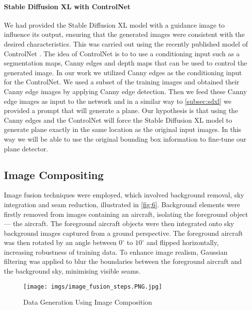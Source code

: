 \paragraph{Stable Diffusion XL with ControlNet}We had provided the Stable Diffusion XL model with a guidance image to influence its output, ensuring that the generated images were consistent with the desired characteristics. This was carried out using the recently published model of ControlNet \cite{controlnet}. The idea of ControlNet is to to use a conditioning input such as a segmentation maps, Canny edges and depth maps that can be used to control the generated image. In our work we utilized Canny edges as the conditioning input for the ControlNet. We used a subset of the training images and obtained their Canny edge images by applying Canny edge detection. Then we feed these Canny edge images as input to the network and in a similar way to \autoref{subsec:sdxl} we provided a prompt that will generate a plane. Our hypothesis is that using the Canny edges and the ControlNet will force the Stable Diffusion XL model to generate plane exactly in the same location as the original input images. In this way we will be able to use the original bounding box information to fine-tune our plane detector. %


\subsection{Image Compositing}
Image fusion techniques were employed, which involved background removal, sky integration and seam reduction, illustrated in \autoref{fig:6}. Background elements were firstly removed from images containing an aircraft, isolating the foreground object --- the aircraft. The foreground aircraft objects were then integrated onto sky background images captured from a ground perspective. The foreground aircraft was then rotated by an angle between $0^\circ$ to $10^\circ$ and flipped horizontally, increasing robustness of training data. To enhance image realism, Gaussian filtering was applied to blur the boundaries between the foreground aircraft and the background sky, minimising visible seams.

\begin{figure*}[h]
\begin{center}
   \texttt{[image: imgs/image\_fusion\_steps.PNG.jpg]}
\end{center}
   \caption{Data Generation Using Image Composition}
\label{fig:6}
\end{figure*}

